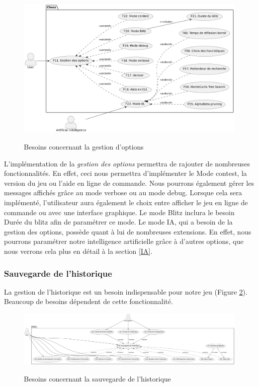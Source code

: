 \documentclass{article}
\begin{document}
\begin{figure}[h]
    \caption{Besoins concernant la gestion d'options}
    \centering
    \includegraphics[width=\textwidth,height=\textheight,keepaspectratio]{needs_options}
    \label{fig:needs_options}
\end{figure}

L'implémentation de la \textit{gestion des options }permettra de rajouter de nombreuses fonctionnalités.
En effet, ceci nous permettra d'implémenter le Mode contest, la version du jeu ou l'aide en ligne de commande. Nous pourrons également gérer les messages affichés grâce au mode verbose ou au mode debug.
Lorsque cela sera implémenté, l'utilisateur aura également le choix entre afficher le jeu en ligne de commande ou avec une interface graphique.
Le mode Blitz inclura le besoin Durée du blitz afin de paramétrer ce mode.
Le mode IA, qui a besoin de la gestion des options, possède quant à lui de nombreuses extensions. En effet, nous pourrons paramétrer
notre intelligence artificielle grâce à d'autres options, que nous verrons cela plus en détail à la section \ref{IA}.


\subsubsection{Sauvegarde de l'historique}
La gestion de l'historique est un besoin indispensable pour notre jeu (Figure \ref{fig:needs_files}).
Beaucoup de besoins dépendent de cette fonctionnalité.
\begin{figure}[h]
    \caption{Besoins concernant la sauvegarde de l'historique}
    \centering
    \includegraphics[width=\textwidth,height=\textheight,keepaspectratio]{needs_files}
    \label{fig:needs_files}
\end{figure}
\end{document}
